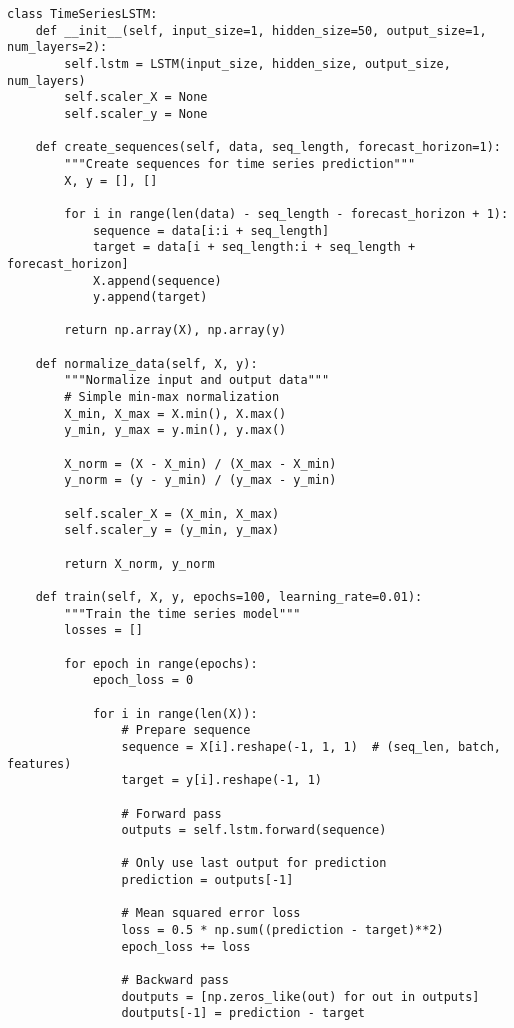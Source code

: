﻿\documentclass[12pt,a4paper]{article}
\begin{document}
\begin{lstlisting}
class TimeSeriesLSTM:
    def __init__(self, input_size=1, hidden_size=50, output_size=1, num_layers=2):
        self.lstm = LSTM(input_size, hidden_size, output_size, num_layers)
        self.scaler_X = None
        self.scaler_y = None
    
    def create_sequences(self, data, seq_length, forecast_horizon=1):
        """Create sequences for time series prediction"""
        X, y = [], []
        
        for i in range(len(data) - seq_length - forecast_horizon + 1):
            sequence = data[i:i + seq_length]
            target = data[i + seq_length:i + seq_length + forecast_horizon]
            X.append(sequence)
            y.append(target)
        
        return np.array(X), np.array(y)
    
    def normalize_data(self, X, y):
        """Normalize input and output data"""
        # Simple min-max normalization
        X_min, X_max = X.min(), X.max()
        y_min, y_max = y.min(), y.max()
        
        X_norm = (X - X_min) / (X_max - X_min)
        y_norm = (y - y_min) / (y_max - y_min)
        
        self.scaler_X = (X_min, X_max)
        self.scaler_y = (y_min, y_max)
        
        return X_norm, y_norm
    
    def train(self, X, y, epochs=100, learning_rate=0.01):
        """Train the time series model"""
        losses = []
        
        for epoch in range(epochs):
            epoch_loss = 0
            
            for i in range(len(X)):
                # Prepare sequence
                sequence = X[i].reshape(-1, 1, 1)  # (seq_len, batch, features)
                target = y[i].reshape(-1, 1)
                
                # Forward pass
                outputs = self.lstm.forward(sequence)
                
                # Only use last output for prediction
                prediction = outputs[-1]
                
                # Mean squared error loss
                loss = 0.5 * np.sum((prediction - target)**2)
                epoch_loss += loss
                
                # Backward pass
                doutputs = [np.zeros_like(out) for out in outputs]
                doutputs[-1] = prediction - target
                

\end{lstlisting}
\end{document}
